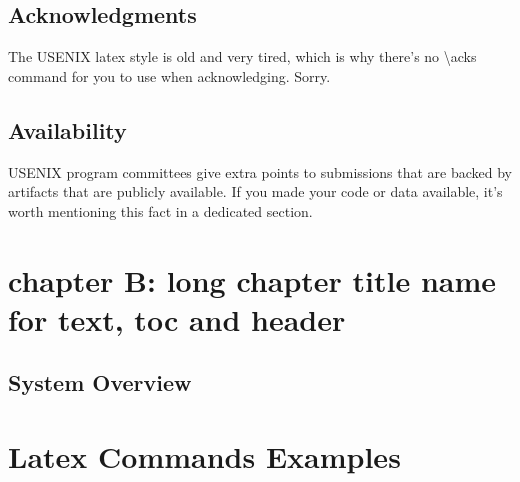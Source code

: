 \section*{Acknowledgments}

The USENIX latex style is old and very tired, which is why there's no \textbackslash{}acks command for you to use when acknowledging. Sorry.\par

\section*{Availability}

USENIX program committees give extra points to submissions that are backed by artifacts that are publicly available. If you made your code or data available, it's worth mentioning this fact in a dedicated section.\par

\chapter[chapter B: manage long chap name]{chapter B: long chapter title name for text, toc and header}
\zhlipsum[8-12]

\section{System Overview}
\zhlipsum[9-13]

\chapter{Latex Commands Examples}

